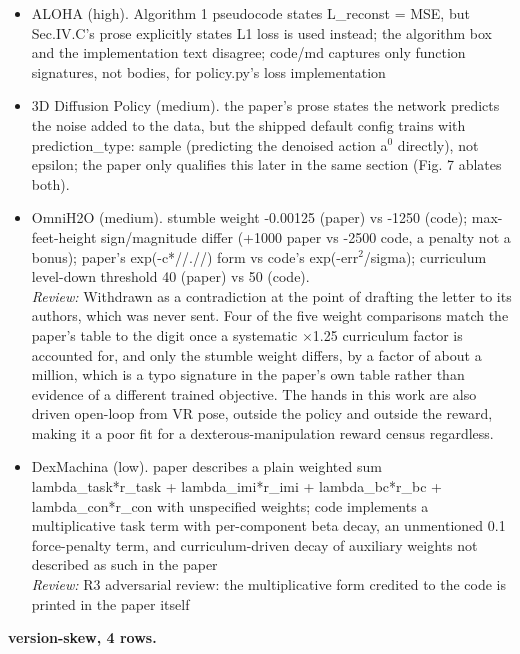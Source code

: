\begin{itemize}
\item ALOHA \cite{aloha_act_2023} (high). Algorithm 1 pseudocode states L\_\allowbreak{}reconst = MSE, but Sec.IV.C's prose explicitly states L1 loss is used instead; the algorithm box and the implementation text disagree; code/md captures only function signatures, not bodies, for policy.py's loss implementation
\item 3D Diffusion Policy \cite{dp3_2024} (medium). the paper's prose states the network predicts the noise added to the data, but the shipped default config trains with prediction\_\allowbreak{}type: sample (predicting the denoised action a$^{0}$ directly), not epsilon; the paper only qualifies this later in the same section (Fig. 7 ablates both).
\item OmniH2O \cite{omnih2o_2024} (medium). stumble weight -0.00125 (paper) vs -1250 (code); max-feet-height sign/magnitude differ (+1000 paper vs -2500 code, a penalty not a bonus); paper's exp(-c*//.//) form vs code's exp(-err$^{2}$/sigma); curriculum level-down threshold 40 (paper) vs 50 (code).
  \\ \emph{Review:} Withdrawn as a contradiction at the point of drafting the letter to its authors, which was never sent. Four of the five weight comparisons match the paper's table to the digit once a systematic $\times$1.25 curriculum factor is accounted for, and only the stumble weight differs, by a factor of about a million, which is a typo signature in the paper's own table rather than evidence of a different trained objective. The hands in this work are also driven open-loop from VR pose, outside the policy and outside the reward, making it a poor fit for a dexterous-manipulation reward census regardless.
\item DexMachina \cite{dexmachina_2025} (low). paper describes a plain weighted sum lambda\_\allowbreak{}task*r\_\allowbreak{}task + lambda\_\allowbreak{}imi*r\_\allowbreak{}imi + lambda\_\allowbreak{}bc*r\_\allowbreak{}bc + lambda\_\allowbreak{}con*r\_\allowbreak{}con with unspecified weights; code implements a multiplicative task term with per-component beta decay, an unmentioned 0.1 force-penalty term, and curriculum-driven decay of auxiliary weights not described as such in the paper
  \\ \emph{Review:} R3 adversarial review: the multiplicative form credited to the code is printed in the paper itself
\end{itemize}

\textbf{version-skew, 4 rows.}

